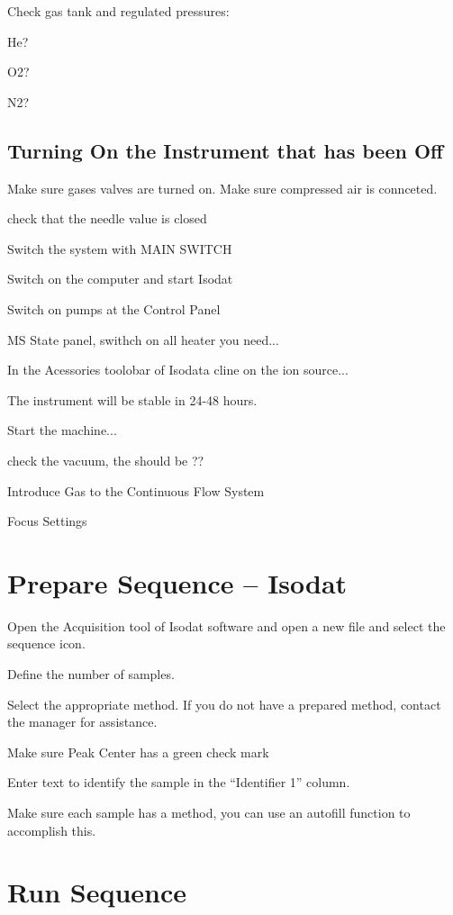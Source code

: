 \documentclass[12pt]{../SOP3_beta}\usepackage[]{graphicx}\usepackage[]{color}
\begin{document}
\NP Check gas tank and regulated pressures:

He?

O2?

N2?


\subsection{Turning On the Instrument that has been Off}

\NP Make sure gases valves are turned on. Make sure compressed air is connceted.

\NP check that the needle value is closed

\NP Switch the system with MAIN SWITCH

\NP Switch on the computer and start Isodat

\NP Switch on pumps at the Control Panel

\NP MS State panel, swithch on all heater you need...

\NP In the Acessories toolobar of Isodata cline on the ion source...

\NP The instrument will be stable in 24-48 hours.

\NP Start the machine...

\NP check the vacuum, the should be ??

\NP Introduce Gas to the Continuous Flow System

\NP Focus Settings





\section{Prepare Sequence -- Isodat}

\NP Open the Acquisition tool of Isodat software and open a new file and select the sequence icon. 

\NP Define the number of samples. 

\NP Select the appropriate method. If you do not have a prepared method, contact the manager for assistance. 

\NP Make sure Peak Center has a green check mark

\NP Enter text to identify the sample in the ``Identifier 1'' column.

\NP Make sure each sample has a method, you can use an autofill function to accomplish this.

\section{Run Sequence}
\end{document}
